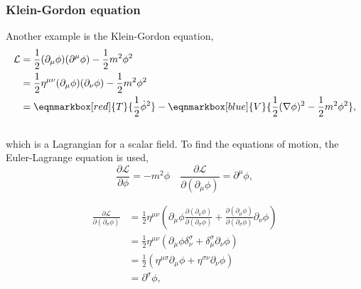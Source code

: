 \subsubsection{Klein-Gordon equation}
Another example is the Klein-Gordon equation,
\begin{equation}
\begin{aligned}
  \mathcal{L} &= \frac{1}{2}(\partial_\mu \phi)(\partial^\mu \phi) - \frac{1}{2}m^2\phi^2\\
              &= \frac{1}{2}\eta^{\mu\nu}(\partial_\mu \phi)(\partial_\nu \phi) - \frac{1}{2}m^2\phi^2\\
              &= \eqnmarkbox[red]{T}{\frac{1}{2} \dot \phi^2} - \eqnmarkbox[blue]{V}{\frac{1}{2}(\nabla \phi)^2 - \frac{1}{2}m^2\phi^2},
\end{aligned}
\end{equation}
\\

\vspace{-3mm}
which is a Lagrangian for a scalar field. To find the equations of motion, the Euler-Lagrange equation is used,
\begin{equation}
  \frac{\partial\mathcal{L}}{\partial\phi} = -m^2\phi \quad \frac{\partial\mathcal{L}}{\partial(\partial_\mu \phi)} = \partial^\mu \phi,
\end{equation}
\begin{derivation}
  \begin{equation}
    \begin{aligned}
      \frac{\partial\mathcal{L}}{\partial(\partial_\sigma\phi)} &= \frac{1}{2}\eta^{\mu\nu}\left(\partial_\mu\phi \frac{\partial(\partial_\nu\phi)}{\partial(\partial_\sigma\phi)} + \frac{\partial(\partial_\mu\phi)}{\partial(\partial_\sigma\phi)}\partial_\nu\phi\right)\\
                                                             &= \frac{1}{2}\eta^{\mu\nu}(\partial_\mu\phi \delta^\sigma_\nu + \delta^\sigma_\mu\partial_\nu\phi)\\
                                                             &= \frac{1}{2}(\eta^{\mu\sigma}\partial_\mu\phi + \eta^{\sigma\nu}\partial_\nu\phi)\\
                                                             &=\partial^\sigma\phi,
    \end{aligned}
  \end{equation}
\end{derivation}

